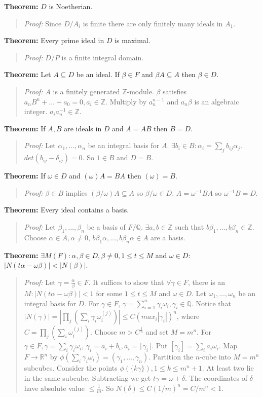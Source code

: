 {\bf Theorem:} $D$ is Noetherian.
\begin{quote}
\emph{Proof:}
Since $D/A_i$ is finite there are only finitely many ideals in $A_1$.
\end{quote}
{\bf Theorem:}
Every prime ideal in $D$ is maximal.
\begin{quote}
\emph{Proof:}
$D/P$ is a finite integral domain.
\end{quote}
{\bf Theorem:}
Let $A \subseteq D$ be an ideal.  If $\beta \in F$ and $\beta A \subseteq A$ then
$\beta \in D$.
\begin{quote}
\emph{Proof:} $A$ is a finitely generated ${\mathbb Z}$-module.  $\beta$ satisfies
$a_n B^n+ \ldots + a_0 = 0, a_i \in {\mathbb Z}$.  Multiply by $a_n^{n-1}$ and $a_n \beta$ is an algebraic
integer.  $a_i a_n^{-1} \in {\mathbb Z}$.
\end{quote}
{\bf Theorem:}
If $A, B$ are ideals in $D$ and $A= AB$ then $B=D$.
\begin{quote}
\emph{Proof:} 
Let $\alpha_1, \ldots , \alpha_n$ be an integral basis for $A$.  $\exists b_i \in B:
\alpha_i = \sum_j b_{ij} \alpha_j$.  $det(b_{ij}- \delta_{ij})= 0$.  So $1 \in B$ and $D=B$.
\end{quote}
{\bf Theorem:}
If $\omega \in D$ and $( \omega ) A = B A$ then $( \omega ) = B$.
\begin{quote}
\emph{Proof:} 
$\beta \in B$ implies $(\beta / \omega ) A \subseteq A$ so $ \beta / \omega \in D$.
$A= \omega^{-1} B A$ so $\omega^{-1} B = D$.
\end{quote}
{\bf Theorem:}
Every ideal contains a basis.
\begin{quote}
\emph{Proof:} 
Let $\beta_1, \ldots , \beta_n$ be a basis of $F/{\mathbb Q}$.  $\exists a, b \in {\mathbb Z}$
such that $b \beta_1, \ldots , b\beta_n \in {\mathbb Z}$.  Choose $\alpha \in A, \alpha \neq 0$,
$b\beta_1 \alpha , \ldots , b\beta_n \alpha \in A$ are a basis.
\end{quote}
{\bf Theorem:}
$\exists M(F): \alpha , \beta \in D, \beta \ne 0, 1 \leq t \leq M$ and $\omega \in D$:
$|N( t \alpha - \omega \beta)| < |N(\beta)|$.
\begin{quote}
\emph{Proof:} 
Let $\gamma= {\frac {\alpha}{\beta}} \in F$.  It suffices to show that $\forall \gamma \in F$,
there is an $M: |N(t \alpha - \omega \beta )|< 1$ for some $1 \leq t \leq M$ and $\omega \in D$.
Let $ \omega_1 , \ldots, \omega_n $ be an integral basis for $D$.  For $\gamma \in F$,
$\gamma= \sum_{i=1}^n \gamma_i \omega_i, \gamma_i \in {\mathbb Q}$.
Notice that  $|N(\gamma)|= |\prod_j (\sum_i \gamma_i \omega_i^{(j)})| \leq C (max_i |\gamma_i|)^n$,
where $C= \prod_j ( \sum_i \omega_i^{(j)})$.  Choose $m > C^{\frac 1 n}$ and set $M= m^n$.
For $\gamma \in F, \gamma= \sum_i \gamma_i \omega_i$, 
$\gamma_i = a_i + b_i, a_i= \lceil \gamma_i \rceil$.  Put $[ \gamma_i ]= \sum_i a_i \omega_i$.
Map $F \rightarrow {\mathbb R}^n$ by $\phi(\sum_i \gamma_i \omega_i)= (\gamma_1 , \ldots , \gamma_n)$.
Partition the $n$-cube into $M=m^n$ subcubes.  
Consider the points $\phi(\{k \gamma\}), 1 \leq k \leq m^n + 1$.
At least two lie in the same subcube.  Subtracting we get $t \gamma= \omega + \delta$.
The coordinates of $\delta$ have absolute value $\leq {\frac 1 m}$.  
So $N(\delta) \leq C(1/m)^n= C/m^n<1$.
\end{quote}
